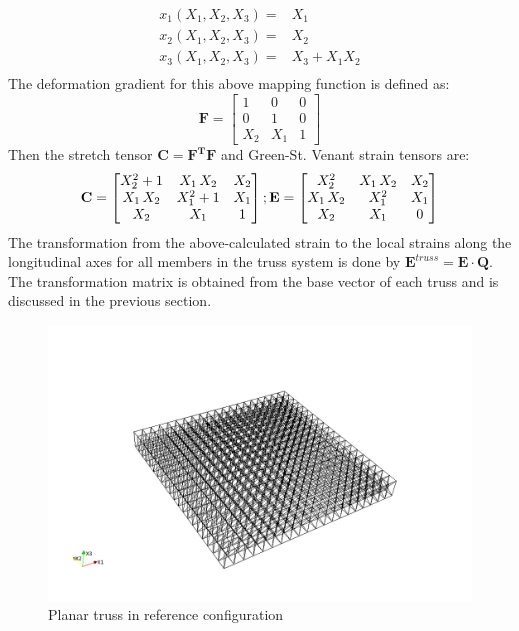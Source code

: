 \begin{equation}
\begin{aligned}
x_1(X_1,X_2,X_3) = & X_1 \\
x_2(X_1,X_2,X_3) = & X_2 \\
x_3(X_1,X_2,X_3) = & X_3+X_1 X_2 \\
\end{aligned}
\label{doubly_curved_mapping:eqn}
\end{equation}
The deformation gradient for this above mapping function is defined as:
\begin{equation}
\mathbf F=
\begin{bmatrix}
1&0&0 \\
0&1&0 \\
X_2 & X_1 & 1
\end{bmatrix}
\label{deformation_gradient_doubly_curved_mapping:eqn}
\end{equation}
Then the stretch tensor $\mathbf C=\mathbf {F^T F}$ and Green-St. Venant strain tensors are:
\begin{equation}
\mathbf C=
\begin{bmatrix}
X_{2}^2+1&X_{1}\,
X_{2}&X_{2}\cr X_{1}\,X_{2}&X_{1}^2+1&X_{
 1}\cr X_{2}&X_{1}&1\cr 
\end{bmatrix}
; \mathbf E=
\begin{bmatrix}
X_{2}^2&X_{1}\,X_{2}&X_{2}\cr X_{1}\,X_{2}&X_{1}^2&X_{1}\cr X_{2}&X_{1}&0\cr 
 \end{bmatrix}
\label{green_deformation_tensor_doubly_curved_mapping:eqn}
\end{equation} 
The transformation from the above-calculated strain to the local strains along the longitudinal axes for all members in the truss system is done by $\mathbf E^{truss}=\mathbf E \cdot \mathbf {Q}$. The transformation matrix is obtained from the base vector of each truss and is discussed in the previous section.

\begin{figure} 
\centering
\includegraphics[width=6.0in]{./chap_5_active_trusses/images_space_filler/planar_truss_ref_config.png}
\caption{Planar truss in reference configuration}
\label{fig:planar_truss_ref_config}
\end{figure}


